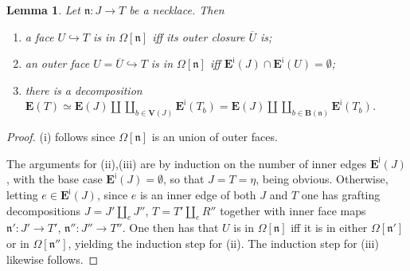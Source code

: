 \documentclass[a4paper,10pt
,draft
]{article}%
\numberwithin{equation}{section}
\numberwithin{figure}{section}
\newtheorem{lemma}[equation]{Lemma}%
\theoremstyle{definition} %
\newtheorem{remark}[equation]{Remark}%
\newcommand{\1}{\ensuremath{\mathbbm 1}}%
\begin{document}


\begin{lemma}\label{FACEINNECK LEM}
	Let $\mathfrak{n} \colon J \to T$ be a necklace. Then
	\begin{enumerate}[label=(\roman*)]
		\item a face $U \hookrightarrow T$
		is in $\Omega[\mathfrak{n}]$
		iff its outer closure $\overline{U}$ is; 
		\item an outer face 
		$U = \overline{U} \hookrightarrow T$
		is in $\Omega[\mathfrak{n}]$ iff 
		$\boldsymbol{E}^{\mathsf{i}}(J) \cap 
		\boldsymbol{E}^{\mathsf{i}}(U) = \emptyset$;
		\item there is a decomposition
		$
		\boldsymbol{E}(T) \simeq
		\boldsymbol{E}(J) \amalg 
		\coprod_{b \in \boldsymbol{V}(J)}
		\boldsymbol{E}^{\mathsf{i}}(T_b)
		= 
		\boldsymbol{E}(J) \amalg 
		\coprod_{b \in \boldsymbol{B}(\mathfrak{n})}
		\boldsymbol{E}^{\mathsf{i}}(T_b)
		$.
	\end{enumerate}
\end{lemma}


\begin{proof}
	(i) follows since $\Omega[\mathfrak{n}]$ is an union of outer faces.
	
	The arguments for (ii),(iii) are by induction on the number of inner edges $\boldsymbol{E}^{\mathsf{i}}(J)$,
	with the base case $\boldsymbol{E}^{\mathsf{i}}(J) = \emptyset$,
	so that $J=T=\eta$,
	being obvious.
%	
	Otherwise, letting $e \in \boldsymbol{E}^{\mathsf{i}}(J)$, since $e$ is an inner edge of
	both $J$ and $T$
	one has grafting decompositions
	$J = J' \amalg_e J''$,
	$T = T' \amalg_e R''$
	together with inner face maps
	$\mathfrak{n}' \colon J' \to T'$,
	$\mathfrak{n}'' \colon J'' \to T''$.
%
	One then has that 
	$U$ is in $\Omega[\mathfrak{n}]$
	iff it is in either
	$\Omega[\mathfrak{n}']$ or in $\Omega[\mathfrak{n}'']$,
	yielding the induction step for (ii).
	The induction step for (iii) likewise follows. 
\end{proof}
\end{document}
